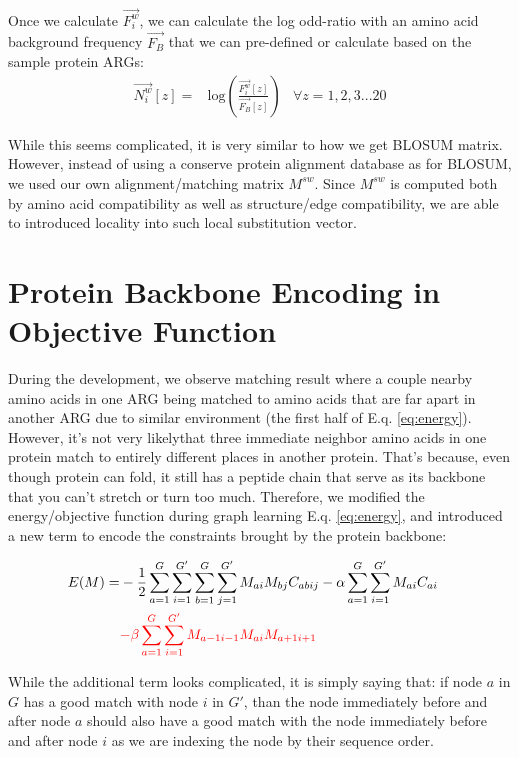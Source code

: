 Once we calculate $\overrightarrow{F^w_i}$, we can calculate the log odd-ratio with an amino acid background frequency $\overrightarrow{F_B}$ that we can pre-defined or calculate based on the sample protein ARGs:
\begin{align} 
\overrightarrow{N^w_i}[z] = & \text{log}(\frac{\overrightarrow{F^w_i}[z]}{\overrightarrow{F_B}[z]}) & \forall z=1,2,3...20
\end{align}

While this seems complicated, it is very similar to how we get BLOSUM matrix. However, instead of using a conserve protein alignment database as for BLOSUM, we used our own alignment/matching matrix $M^{sw}$. Since $M^{sw}$ is computed both by amino acid compatibility as well as structure/edge compatibility, we are able to introduced locality into such local substitution vector.

\section{Protein Backbone Encoding in Objective Function}

During the development, we observe matching result where a couple nearby amino acids in one ARG being matched to amino acids that are far apart in another ARG due to similar environment (the first half of E.q. \ref{eq:energy}).\\

However, it's not very likely\footnotemark that three immediate neighbor amino acids in one protein match to entirely different places in another protein. That's because, even though protein can fold, it still has a peptide chain that serve as its backbone that you can't stretch or turn too much. Therefore, we modified the energy/objective function during graph learning E.q. \ref{eq:energy}, and introduced a new term to encode the constraints brought by the protein backbone:

\begin{align}
E(M)=&-\frac{1}{2}\sum_{a=1}^{G}\sum_{i=1}^{G'}\sum_{b=1}^{G}\sum_{j=1}^{G'}M_{ai}M_{bj}C_{abij}-\alpha\sum_{a=1}^{G}\sum_{i=1}^{G'}M_{ai}C_{ai}\nonumber\\
&\color{red}{-\beta\sum_{a=1}^{G}\sum_{i=1}^{G'}M_{a-1i-1}M_{ai}M_{a+1i+1}}&
\end{align}

While the additional term looks complicated, it is simply saying that: if node $a$ in $G$ has a good match with node $i$ in $G'$, than the node immediately before and after node $a$ should also have a good match with the node immediately before and after node $i$ as we are indexing the node by their sequence order.

